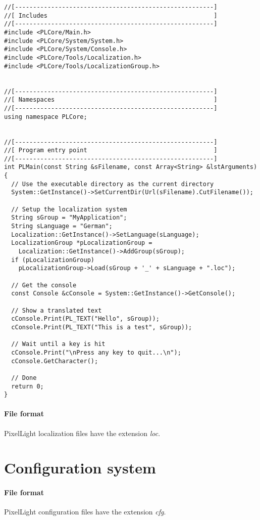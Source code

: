 \begin{lstlisting}[caption=Localization usage example]
//[-------------------------------------------------------]
//[ Includes                                              ]
//[-------------------------------------------------------]
#include <PLCore/Main.h>
#include <PLCore/System/System.h>
#include <PLCore/System/Console.h>
#include <PLCore/Tools/Localization.h>
#include <PLCore/Tools/LocalizationGroup.h>


//[-------------------------------------------------------]
//[ Namespaces                                            ]
//[-------------------------------------------------------]
using namespace PLCore;


//[-------------------------------------------------------]
//[ Program entry point                                   ]
//[-------------------------------------------------------]
int PLMain(const String &sFilename, const Array<String> &lstArguments)
{
  // Use the executable directory as the current directory
  System::GetInstance()->SetCurrentDir(Url(sFilename).CutFilename());

  // Setup the localization system
  String sGroup = "MyApplication";
  String sLanguage = "German";
  Localization::GetInstance()->SetLanguage(sLanguage);
  LocalizationGroup *pLocalizationGroup =
    Localization::GetInstance()->AddGroup(sGroup);
  if (pLocalizationGroup)
    pLocalizationGroup->Load(sGroup + '_' + sLanguage + ".loc");

  // Get the console
  const Console &cConsole = System::GetInstance()->GetConsole();

  // Show a translated text
  cConsole.Print(PL_TEXT("Hello", sGroup));
  cConsole.Print(PL_TEXT("This is a test", sGroup));

  // Wait until a key is hit
  cConsole.Print("\nPress any key to quit...\n");
  cConsole.GetCharacter();

  // Done
  return 0;
}
\end{lstlisting}


\paragraph{File format}
PixelLight localization files have the extension \emph{loc}.




\section{Configuration system}
\paragraph{File format}
PixelLight configuration files have the extension \emph{cfg}.
